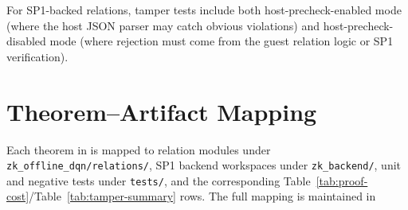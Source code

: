 For SP1-backed relations, tamper tests include both host-precheck-enabled
mode (where the host JSON parser may catch obvious violations) and
host-precheck-disabled mode (where rejection must come from the guest
relation logic or SP1 verification).

\section{Theorem--Artifact Mapping}
\label{app:theorem-map}

Each theorem in  is mapped to relation modules under
\texttt{zk\_offline\_dqn/relations/}, SP1 backend workspaces under
\texttt{zk\_backend/}, unit and negative tests under \texttt{tests/}, and the
corresponding Table~\ref{tab:proof-cost}/Table~\ref{tab:tamper-summary} rows.
\noindent The full mapping is maintained in
\begin{center}
\scriptsize{}\\
\end{center}
